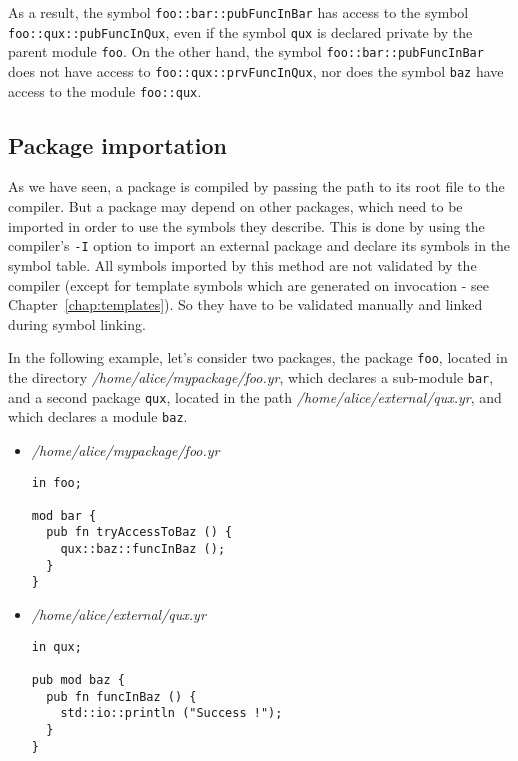 

As a result, the symbol \texttt{foo::bar::pubFuncInBar} has access to the symbol
\texttt{foo::qux::pubFuncInQux}, even if the symbol \texttt{qux} is declared
private by the parent module \texttt{foo}. On the other hand, the symbol
\texttt{foo::bar::pubFuncInBar} does not have access to
\texttt{foo::qux::prvFuncInQux}, nor does the symbol \texttt{baz} have access to
the module \texttt{foo::qux}.

\subsection{Package importation}

As we have seen, a package is compiled by passing the path to its root file to
the compiler. But a package may depend on other packages, which need to be
imported in order to use the symbols they describe. This is done by using the
compiler's \texttt{-I} option to import an external package and declare its
symbols in the symbol table. All symbols imported by this method are not
validated by the compiler (except for template symbols which are generated on
invocation - see Chapter~\ref{chap:templates}). So they have to be validated
manually and linked during symbol linking.

In the following example, let's consider two packages, the package \texttt{foo},
located in the directory \textit{/home/alice/mypackage/foo.yr}, which declares a
sub-module \texttt{bar}, and a second package \texttt{qux}, located in the path
\textit{/home/alice/external/qux.yr}, and which declares a module \texttt{baz}.

\begin{itemize}
\item \textit{/home/alice/mypackage/foo.yr}
  \begin{lstlisting}[style=coloredverbatim]
in foo;

mod bar {
  pub fn tryAccessToBaz () {
    qux::baz::funcInBaz ();
  }
}
  \end{lstlisting}


\item \textit{/home/alice/external/qux.yr}
  \begin{lstlisting}[style=coloredverbatim]
in qux;

pub mod baz {
  pub fn funcInBaz () {
    std::io::println ("Success !");
  }
}
  \end{lstlisting}
\end{itemize}

